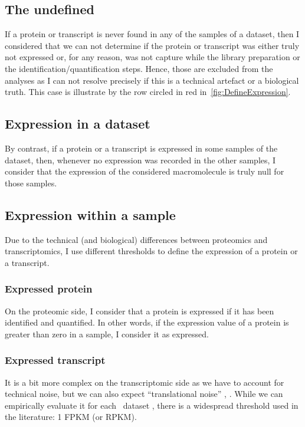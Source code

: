 \subsection{The undefined}%
\label{subsec:ExpressedOrNot-undefined}
If a protein or transcript is never found in any of the samples of a dataset,
then I considered that we can not determine if the protein or transcript was
either truly not expressed or, for any reason, was not capture while the library
preparation or the identification/quantification steps. Hence, those are
excluded from the analyses as I can not resolve precisely if this is a
technical artefact or a biological truth. This case is illustrate by the row
circled in red in~\cref{fig:DefineExpression}.

\subsection{Expression in a dataset}
\label{subsec:ExpressedOrNot--expDataset}
By contrast, if a protein or a transcript is expressed in some samples of the
dataset, then, whenever no expression was recorded in the other
samples, I consider that the expression of the considered macromolecule is truly
null for those samples.

\subsection{Expression within a sample}
Due to the technical (and biological) differences between proteomics and
transcriptomics, I use different thresholds to define the expression of a protein
or a transcript.

\subsubsection{Expressed protein}
On the proteomic side, I consider that a protein is expressed if it has been
identified and quantified. In other words, if the expression value of a protein
is greater than zero in a sample, I consider it as expressed.

\subsubsection{Expressed transcript}\label{subsubsec:exprTrans}
It is a bit more complex on the transcriptomic side as we have to account for
technical noise, but we can also expect ``translational noise'' \citep{rnaseq-2009},
\citep{lowNoiseLimit}.
While we can empirically evaluate it for each \Rnaseq\ dataset \citep{ramskoldan:2009},
there is a widespread threshold used in the literature:
1 \gls{FPKM} (or \gls{RPKM}).

